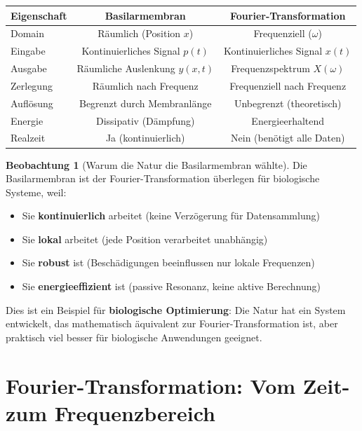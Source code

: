 ﻿\documentclass[a4paper,12pt]{report}
\theoremstyle{definition}
\newtheorem{beobachtung}{Beobachtung}
\begin{document}
	\begin{center}
		\begin{tabular}{|l|c|c|}
			\hline
			\textbf{Eigenschaft} & \textbf{Basilarmembran} & \textbf{Fourier-Transformation} \\
			\hline
			Domain & Räumlich (Position $x$) & Frequenziell ($\omega$) \\
			\hline
			Eingabe & Kontinuierliches Signal $p(t)$ & Kontinuierliches Signal $x(t)$ \\
			\hline
			Ausgabe & Räumliche Auslenkung $y(x,t)$ & Frequenzspektrum $X(\omega)$ \\
			\hline
			Zerlegung & Räumlich nach Frequenz & Frequenziell nach Frequenz \\
			\hline
			Auflösung & Begrenzt durch Membranlänge & Unbegrenzt (theoretisch) \\
			\hline
			Energie & Dissipativ (Dämpfung) & Energieerhaltend \\
			\hline
			Realzeit & Ja (kontinuierlich) & Nein (benötigt alle Daten) \\
			\hline
		\end{tabular}
	\end{center}
	
	\begin{beobachtung}[Warum die Natur die Basilarmembran wählte]
		
		Die Basilarmembran ist der Fourier-Transformation überlegen für biologische Systeme, weil:
		
		\begin{itemize}
			\item[-] Sie \textbf{kontinuierlich} arbeitet (keine Verzögerung für Datensammlung)
			\item[-] Sie \textbf{lokal} arbeitet (jede Position verarbeitet unabhängig)
			\item[-] Sie \textbf{robust} ist (Beschädigungen beeinflussen nur lokale Frequenzen)
			\item[-] Sie \textbf{energieeffizient} ist (passive Resonanz, keine aktive Berechnung)
		\end{itemize}
		
		Dies ist ein Beispiel für \textbf{biologische Optimierung}: Die Natur hat ein System entwickelt, das mathematisch äquivalent zur Fourier-Transformation ist, aber praktisch viel besser für biologische Anwendungen geeignet.
	\end{beobachtung}
	
	\chapter{Fourier-Transformation: Vom Zeit- zum Frequenzbereich}
	
\end{document}

